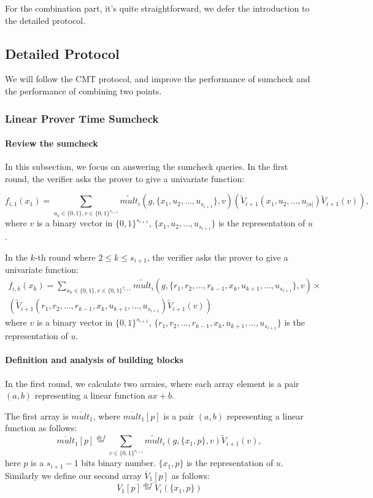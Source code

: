 For the combination part, it's quite straightforward, we defer the introduction to the detailed protocol.

\subsection{Detailed Protocol}
We will follow the CMT protocol, and improve the performance of sumcheck and the performance of combining two points.
\subsubsection{Linear Prover Time Sumcheck}
\paragraph{Review the sumcheck}
In this subsection, we focus on answering the sumcheck queries. In the first round, the verifier asks the prover to give a univariate function: 

$$f_{i, 1}(x_1)=\sum_{u_{k} \in \{0, 1\}, v \in \{0, 1\}^{s_{i+1}}}\tilde{mult}_{i}(g, \{x_1, u_{2},..., u_{s_{i+1}}\}, v)(\tilde{V}_{i+1}(x_1, u_{2},..., u_{|u|})\tilde{V}_{i+1}(v)),$$
where $v$ is a binary vector in $\{0, 1\}^{s_{i+1}}$, $\{x_1, u_{2},..., u_{s_{i+1}}\}$ is the representation of $u$.

In the $k$-th round where $2\le k\le s_{i+1}$, the verifier asks the prover to give a univariate function:
\begin{align*}
f_{i,k}(x_k)=\sum_{u_k \in \{0, 1\}, v \in \{0, 1\}^{s_{i+1}}}\tilde{mult}_{i}(g, \{r_1,r_2,...,r_{k-1},x_k, u_{k+1},..., u_{s_{i+1}}\}, v)\times\\
(\tilde{V}_{i+1}(r_1,r_2,...,r_{k-1},x_k, u_{k+1},..., u_{s_{i+1}})\tilde{V}_{i+1}(v))
\end{align*}
where $v$ is a binary vector in $\{0, 1\}^{s_{i+1}}$, $\{r_1,r_2,...,r_{k-1},x_k, u_{k+1},..., u_{s_{i+1}}\}$ is the representation of $u$.

\paragraph{Definition and analysis of building blocks}
In the first round, we calculate two arraies, where each array element is a pair $(a, b)$ representing a linear function $ax+b$.

The first array is $\overline{mult}_1$, where $\overline{mult}_1[p]$ is a pair $(a, b)$ representing a linear function as follows:
$$\overline{mult}_1[p]\overset{def}{=}\sum_{v\in \{0,1\}^{s_{i+1}}}\tilde{mult}_i(g, \{x_1, p\}, v)\tilde{V}_{i+1}(v),$$
here $p$ is a $s_{i+1}-1$ bits binary number. $\{x_1, p\}$ is the representation of $u$. Similarly we define our second array $\overline{V}_1[p]$ as follows:
$$\overline{V}_1[p]\overset{def}{=}\tilde{V}_i(\{x_1, p\})$$

